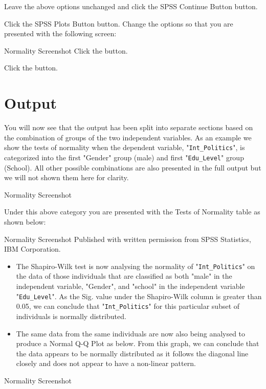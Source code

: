 \documentclass[]{article}
\begin{document}
Leave the above options unchanged and click the SPSS Continue Button button.

Click the SPSS Plots Button button. Change the options so that you are presented with the following screen:

Normality Screenshot
Click the  button.

Click the  button.

\section{Output}
You will now see that the output has been split into separate sections based on the combination of groups of the two independent variables. As an example we show the tests of normality when the dependent variable, "\texttt{Int\_Politics}", is categorized into the first "Gender" group (male) and first "\texttt{Edu\_Level}" group (School). All other possible combinations are also presented in the full output but we will not shown them here for clarity.

Normality Screenshot

Under this above category you are presented with the Tests of Normality table as shown below:

Normality Screenshot
Published with written permission from SPSS Statistics, IBM Corporation.

\begin{itemize}
	\item The Shapiro-Wilk test is now analysing the normality of "\texttt{Int\_Politics}" on the data of those individuals that are classified as both "male" in the independent variable, "Gender", and "school" in the independent variable "\texttt{Edu\_Level}". As the Sig. value under the Shapiro-Wilk column is greater than 0.05, we can conclude that "\texttt{Int\_Politics}" for this particular subset of individuals is normally distributed.

	\item  The same data from the same individuals are now also being analysed to produce a Normal Q-Q Plot as below. From this graph, we can conclude that the data appears to be normally distributed as it follows the diagonal line closely and does not appear to have a non-linear pattern.
\end{itemize}



Normality Screenshot

\end{document}
